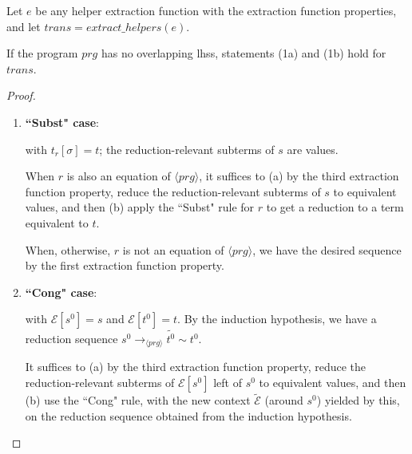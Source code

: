 \begin{proposition}

Let $e$ be any helper extraction function with the extraction function properties, and let $trans = extract\_helpers(e)$.

If the program $prg$ has no overlapping lhss, statements (1a) and (1b) hold for $trans$.

\begin{proof}

\begin{enumerate}
\item \textbf{``Subst" case}:

\begin{prooftree}
\end{prooftree}

with $t_r[\sigma] = t$; the reduction-relevant subterms of $s$ are values.

When $r$ is also an equation of $\langle prg \rangle$, it suffices to (a) by the third extraction function property, reduce the reduction-relevant subterms of $s$ to equivalent values, and then (b) apply the ``Subst" rule for $r$ to get a reduction to a term equivalent to $t$.

When, otherwise, $r$ is not an equation of $\langle prg \rangle$, we have the desired sequence by the first extraction function property.

\item \textbf{``Cong" case}:

\begin{prooftree}
\end{prooftree}

with $\mathcal{E}[s^0] = s$ and $\mathcal{E}[t^0] = t$. By the induction hypothesis, we have a reduction sequence $s^0 \longrightarrow_{\langle prg \rangle} \widetilde{t^0} \sim t^0$.

It suffices to (a) by the third extraction function property, reduce the reduction-relevant subterms of $\mathcal{E}[s^0]$ left of $s^0$ to equivalent values, and then (b) use the ``Cong" rule, with the new context $\widetilde{\mathcal{E}}$ (around $s^0$) yielded by this, on the reduction sequence obtained from the induction hypothesis.

\end{enumerate}

\end{proof}

\end{proposition}

